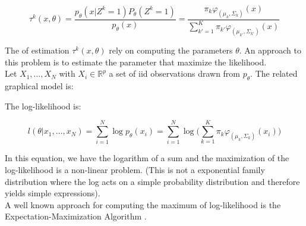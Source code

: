 \documentclass[12pt]{article}
\let\bb\mathbb       %
\def\RR{{\bb R}}\def\ZZ{{\bb Z}}\def\FF{{\bb F}}\def\DD{{\bb D}}
\def\bb{\mathbb}
\begin{document}
\begin{equation}
\label{tau_bayes}
\tau^k(x,\theta)=\frac{p_{\theta}(x|Z^k=1)P_{\theta}(Z^k=1)}{p_{\theta}(x)}
=\frac{\pi_k\varphi_{(\mu_k,\Sigma_k)}(x)}{\sum_{k'=1}^K\pi_{k'}\varphi_{(\mu_{k'},\Sigma_{k'})}(x)}
\end{equation}

The of estimation  $\tau^k(x,\theta)$ rely on computing the parameters $\theta$. An approach to this problem is to estimate the parameter that maximize the likelihood.\\

Let $X_1,\dots,X_N$ with $X_i\in \RR^p$ a set of iid observations drawn from $p_{\theta}$. The related graphical model is:

\begin{figure}[h]
\centering
{}
\end{figure}

The log-likelihood is:

\begin{equation}
l(\theta|x_1,\dots,x_N)=\sum_{i=1}^{N}\log{p_{\theta}(x_i)}=\sum_{i=1}^{N}\log\Big({\sum_{k=1}^K\pi_k\varphi_{(\mu_{k},\Sigma_{k})}(x_i)}\Big)
\end{equation}

In this equation, we have the logarithm of a sum and the maximization of the log-likelihood is a non-linear problem. (This is not a exponential family distribution where the log acts on a simple probability distribution and therefore yields simple expressions).\\
A well known approach for computing the maximum of log-likelihood is the Expectation-Maximization Algorithm \cite{dempster77}.
\end{document}
